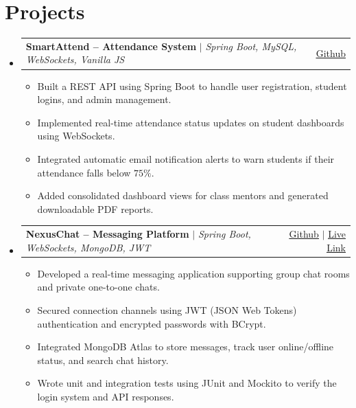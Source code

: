 \documentclass[letterpaper,11pt]{article}
\makeatletter
\newcommand{\resumeItem}[1]{
  \item\normalsize{
    {#1 \vspace{-2pt}}
  }
}
\newcommand{\resumeProjectHeading}[2]{
    \item
    \begin{tabular*}{0.97\textwidth}{l@{\extracolsep{\fill}}r}
      \small#1 & #2 \\
    \end{tabular*}
}
\newcommand{\resumeItemListStart}{\begin{itemize}[leftmargin=0.15in, itemsep=3pt, topsep=3pt, parsep=0pt, partopsep=0pt]}
\newcommand{\resumeItemListEnd}{\end{itemize}}
\makeatother
\begin{document}
\section{Projects}
    \begin{itemize}[leftmargin=0.15in, label={}, itemsep=10pt, topsep=2pt, parsep=0pt, partopsep=0pt]
      \resumeProjectHeading
          {\textbf{SmartAttend -- Attendance System} $|$ \emph{Spring Boot, MySQL, WebSockets, Vanilla JS}}{\href{https://github.com/srijan-mahajan/Attendance-Web-App}{\underline{Github}}}
          \resumeItemListStart
            \resumeItem{Built a REST API using Spring Boot to handle user registration, student logins, and admin management.}
            \resumeItem{Implemented real-time attendance status updates on student dashboards using WebSockets.}
            \resumeItem{Integrated automatic email notification alerts to warn students if their attendance falls below $75\%$.}
            \resumeItem{Added consolidated dashboard views for class mentors and generated downloadable PDF reports.}
          \resumeItemListEnd
          
      \resumeProjectHeading
          {\textbf{NexusChat -- Messaging Platform} $|$ \emph{Spring Boot, WebSockets, MongoDB, JWT}}{\href{https://github.com/srijan-mahajan/Online-Chat-Application}{\underline{Github}} $|$ \href{https://nexuschat-8pkm.onrender.com/}{\underline{Live Link}}}
          \resumeItemListStart
            \resumeItem{Developed a real-time messaging application supporting group chat rooms and private one-to-one chats.}
            \resumeItem{Secured connection channels using JWT (JSON Web Tokens) authentication and encrypted passwords with BCrypt.}
            \resumeItem{Integrated MongoDB Atlas to store messages, track user online/offline status, and search chat history.}
            \resumeItem{Wrote unit and integration tests using JUnit and Mockito to verify the login system and API responses.}
          \resumeItemListEnd
    \end{itemize}

\end{document}

